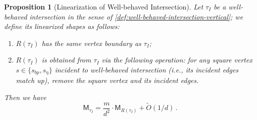 \documentclass[12pt]{article}
\newtheorem{proposition}[theorem]{Proposition}
\newtheorem{definition}[theorem]{Definition}
\newcommand{\gam}{\gamma}
\newcommand{\cm}{\mathsf{M} }
\newcommand{\Authornote}[3]{{\sf\footnotesize\color{#3}{[#1: #2]}}}
\newcommand{\Authornote}[3]{}
\newcommand{\jnote}[1]{\Authornote{Jeff}{#1}{blue}}
\newcommand{\snote}[1]{\Authornote{Sofia}{#1}{orange}}
\begin{document}
\snote{definition 5.4 and proposition 5.5 are somewhat redundant with each other}
\jnote{dropped previous 5.4}
\begin{proposition}[Linearization of Well-behaved Intersection] \label{prop:linearization-well-behaved-vert}
	Let $\tau_I$ be a well-behaved intersection in the sense of \cref{def:well-behaved-intersection-vertical}; we define its linearized shapes as follows:
	\begin{enumerate}
		\item $R(\tau_I)$ has the same vertex boundary as $\tau_I$;
		\item $R(\tau_I)$ is obtained from $\tau_I$ via the following operation: for any square vertex $s \in \{s_{bp}, s_{\eta}\}$ incident to well-behaved intersection (i.e., its incident edges match up), remove the square vertex and its incident edges.
	\end{enumerate}
	Then we have \[
	\cm_{\tau_I} = \frac{m}{d^2}\cdot  \cm_{R(\tau_I)} + \tilde{O}(1/d)\,.
	 \]
\end{proposition}
%
\end{document}
